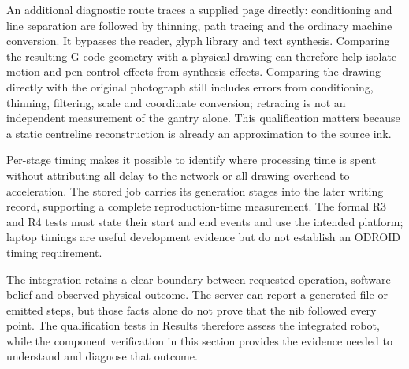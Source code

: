 An additional diagnostic route traces a supplied page directly: conditioning and line separation are followed by thinning, path tracing and the ordinary machine conversion. It bypasses the reader, glyph library and text synthesis. Comparing the resulting G-code geometry with a physical drawing can therefore help isolate motion and pen-control effects from synthesis effects. Comparing the drawing directly with the original photograph still includes errors from conditioning, thinning, filtering, scale and coordinate conversion; retracing is not an independent measurement of the gantry alone. This qualification matters because a static centreline reconstruction is already an approximation to the source ink.

Per-stage timing makes it possible to identify where processing time is spent without attributing all delay to the network or all drawing overhead to acceleration. The stored job carries its generation stages into the later writing record, supporting a complete reproduction-time measurement. The formal R3 and R4 tests must state their start and end events and use the intended platform; laptop timings are useful development evidence but do not establish an ODROID timing requirement.

The integration retains a clear boundary between requested operation, software belief and observed physical outcome. The server can report a generated file or emitted steps, but those facts alone do not prove that the nib followed every point. The qualification tests in Results therefore assess the integrated robot, while the component verification in this section provides the evidence needed to understand and diagnose that outcome.
\FloatBarrier
